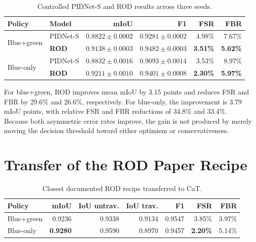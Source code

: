 \documentclass[12pt,a4paper]{report}
\begin{document}
\begin{table}[H]
\centering
\caption{Controlled PIDNet-S and ROD results across three seeds.}
\label{tab:rod_seed_results}
\small
\begin{tabular}{@{}llrrrr@{}}
\toprule
\textbf{Policy} & \textbf{Model} & \textbf{mIoU} & \textbf{F1} & \textbf{FSR} & \textbf{FBR} \\
\midrule
\multirow{2}{*}{Blue+green}
 & PIDNet-S & $0.8822\pm0.0002$ & $0.9281\pm0.0002$ & 4.98\% & 7.67\% \\
 & \textbf{ROD} & $\mathbf{0.9138\pm0.0003}$ & $\mathbf{0.9482\pm0.0003}$ & \textbf{3.51\%} & \textbf{5.62\%} \\
\midrule
\multirow{2}{*}{Blue-only}
 & PIDNet-S & $0.8832\pm0.0016$ & $0.9093\pm0.0014$ & 3.53\% & 8.97\% \\
 & \textbf{ROD} & $\mathbf{0.9211\pm0.0010}$ & $\mathbf{0.9401\pm0.0008}$ & \textbf{2.30\%} & \textbf{5.97\%} \\
\bottomrule
\end{tabular}
\end{table}

For blue+green, ROD improves mean mIoU by 3.15 points and reduces FSR and
FBR by 29.6\% and 26.6\%, respectively. For blue-only, the improvement is
3.79 mIoU points, with relative FSR and FBR reductions of 34.8\% and 33.4\%.
Because both asymmetric error rates improve, the gain is not produced by merely
moving the decision threshold toward either optimism or conservativeness.

\section{Transfer of the ROD Paper Recipe}

\begin{table}[H]
\centering
\caption{Closest documented ROD recipe transferred to CaT.}
\label{tab:rod_paper_recipe}
\small
\begin{tabular}{@{}lrrrrrr@{}}
\toprule
\textbf{Policy} & \textbf{mIoU} & \textbf{IoU untrav.} & \textbf{IoU trav.} & \textbf{F1} & \textbf{FSR} & \textbf{FBR} \\
\midrule
Blue+green & 0.9236 & 0.9338 & 0.9134 & 0.9547 & 3.85\% & 3.97\% \\
Blue-only  & \textbf{0.9280} & 0.9590 & 0.8970 & 0.9457 & \textbf{2.20\%} & 5.14\% \\
\bottomrule
\end{tabular}
\end{table}
\end{document}
